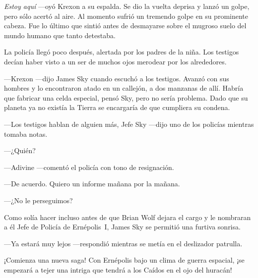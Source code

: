 \emph{Estoy aquí} ---oyó Krexon a su espalda. Se dio la vuelta deprisa y lanzó un golpe, pero sólo acertó al aire. Al momento sufrió un tremendo golpe en su prominente cabeza. Fue lo último que sintió antes de desmayarse sobre el mugroso suelo del mundo humano que tanto detestaba.

La policía llegó poco después, alertada por los padres de la niña. Los testigos decían haber visto a un ser de muchos ojos merodear por los alrededores.

---Krexon ---dijo James Sky cuando escuchó a los testigos. Avanzó con sus hombres y lo encontraron atado en un callejón, a dos manzanas de allí. Habría que fabricar una celda especial, pensó Sky, pero no sería problema. Dado que su planeta ya no existía la Tierra se encargaría de que cumpliera su condena.

---Los testigos hablan de alguien más, Jefe Sky ---dijo uno de los policías mientras tomaba notas.

---¿Quién?

---Adivine ---comentó el policía con tono de resignación.

---De acuerdo. Quiero un informe mañana por la mañana.

---¿No le perseguimos?

Como solía hacer incluso antes de que Brian Wolf dejara el cargo y le nombraran a él Jefe de Policía de Ernépolis~I, James Sky se permitió una furtiva sonrisa.

---Ya estará muy lejos ---respondió mientras se metía en el deslizador patrulla.

\begin{next}
    ¡Comienza una nueva saga! Con Ernépolis bajo un clima de guerra espacial, ¡se empezará a tejer una intriga que tendrá a los Caídos en el ojo del huracán!
\end{next}

\endinput
